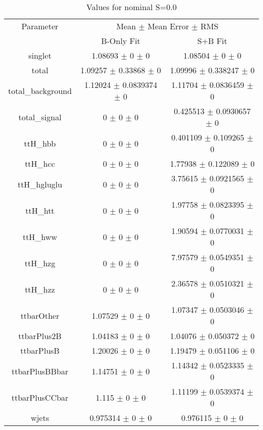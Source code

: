 \begin{table}
\centering
\caption{Values for nominal S=0.0}
\begin{tabular}{ccc}
\toprule
Parameter & \multicolumn{2}{c}{Mean $\pm$ Mean Error $\pm$ RMS}\\
 & B-Only Fit & S+B Fit\\
\midrule
singlet & \num{1.08693} $\pm$ \num{0} $\pm$ \num{0} & \num{1.08504} $\pm$ \num{0} $\pm$ \num{0}\\
total & \num{1.09257} $\pm$ \num{0.33868} $\pm$ \num{0} & \num{1.09996} $\pm$ \num{0.338247} $\pm$ \num{0}\\
total\_background & \num{1.12024} $\pm$ \num{0.0839374} $\pm$ \num{0} & \num{1.11704} $\pm$ \num{0.0836459} $\pm$ \num{0}\\
total\_signal & \num{0} $\pm$ \num{0} $\pm$ \num{0} & \num{0.425513} $\pm$ \num{0.0930657} $\pm$ \num{0}\\
ttH\_hbb & \num{0} $\pm$ \num{0} $\pm$ \num{0} & \num{0.401109} $\pm$ \num{0.109265} $\pm$ \num{0}\\
ttH\_hcc & \num{0} $\pm$ \num{0} $\pm$ \num{0} & \num{1.77938} $\pm$ \num{0.122089} $\pm$ \num{0}\\
ttH\_hgluglu & \num{0} $\pm$ \num{0} $\pm$ \num{0} & \num{3.75615} $\pm$ \num{0.0921565} $\pm$ \num{0}\\
ttH\_htt & \num{0} $\pm$ \num{0} $\pm$ \num{0} & \num{1.97758} $\pm$ \num{0.0823395} $\pm$ \num{0}\\
ttH\_hww & \num{0} $\pm$ \num{0} $\pm$ \num{0} & \num{1.90594} $\pm$ \num{0.0770031} $\pm$ \num{0}\\
ttH\_hzg & \num{0} $\pm$ \num{0} $\pm$ \num{0} & \num{7.97579} $\pm$ \num{0.0549351} $\pm$ \num{0}\\
ttH\_hzz & \num{0} $\pm$ \num{0} $\pm$ \num{0} & \num{2.36578} $\pm$ \num{0.0510321} $\pm$ \num{0}\\
ttbarOther & \num{1.07529} $\pm$ \num{0} $\pm$ \num{0} & \num{1.07347} $\pm$ \num{0.0503046} $\pm$ \num{0}\\
ttbarPlus2B & \num{1.04183} $\pm$ \num{0} $\pm$ \num{0} & \num{1.04076} $\pm$ \num{0.050372} $\pm$ \num{0}\\
ttbarPlusB & \num{1.20026} $\pm$ \num{0} $\pm$ \num{0} & \num{1.19479} $\pm$ \num{0.051106} $\pm$ \num{0}\\
ttbarPlusBBbar & \num{1.14751} $\pm$ \num{0} $\pm$ \num{0} & \num{1.14342} $\pm$ \num{0.0523335} $\pm$ \num{0}\\
ttbarPlusCCbar & \num{1.115} $\pm$ \num{0} $\pm$ \num{0} & \num{1.11199} $\pm$ \num{0.0539374} $\pm$ \num{0}\\
wjets & \num{0.975314} $\pm$ \num{0} $\pm$ \num{0} & \num{0.976115} $\pm$ \num{0} $\pm$ \num{0}\\
\bottomrule
\end{tabular}
\end{table}